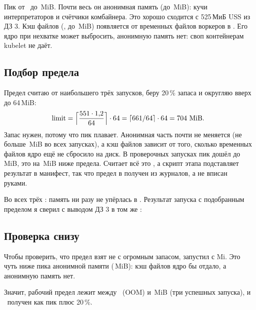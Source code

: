 Пик от \measPeakMin\ до \measPeakMax\,MiB. Почти весь он анонимная память (до \measAnonMax\,MiB): кучи интерпретаторов и счётчики комбайнера. Это хорошо сходится с 525\,МиБ USS из ДЗ 3. Кэш файлов (, до \measFileMax\,MiB) появляется от временных файлов воркеров в . Его ядро при нехватке может выбросить, анонимную память нет: своп контейнерам kubelet не даёт.


\subsection{Подбор предела}
Предел считаю от наибольшего  трёх запусков, беру 20\,\% запаса и округляю вверх до 64\,MiB:
\[
\text{limit} = \Big\lceil \frac{551 \cdot 1{,}2}{64} \Big\rceil \cdot 64 = \lceil 661 / 64 \rceil \cdot 64 = 704\ \text{MiB}.
\]
Запас нужен, потому что пик плавает. Анонимная часть почти не меняется (не больше \measAnonMax\,MiB во всех запусках), а кэш файлов зависит от того, сколько временных файлов ядро ещё не сбросило на диск. В проверочных запусках пик дошёл до \tunedPeakMax\,MiB, это на \tunedHeadroom\,MiB ниже предела. Считает всё это , а скрипт этапа подставляет результат в манифест, так что предел в  получен из журналов, а не вписан руками.


Во всех трёх : память ни разу не упёрлась в . Результат запуска с подобранным пределом я сверил с выводом ДЗ 3 в том же :


\subsection{Проверка снизу}
Чтобы проверить, что предел взят не с огромным запасом, запустил с \belowLimit Mi. Это чуть ниже пика анонимной памяти (\measAnonMax\,MiB): кэш файлов ядро бы отдало, а анонимную память нет.


Значит, рабочий предел лежит между \belowLimit\ (OOM) и \hwLimit\,MiB (три успешных запуска), и \hwLimit\ получен как пик плюс 20\,\%.

